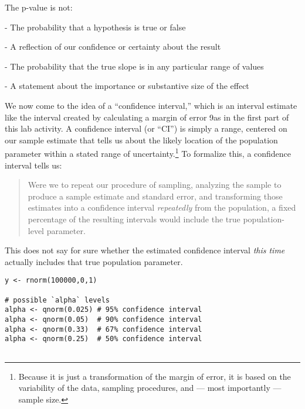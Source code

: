 \documentclass[a4paper,12pt]{article}
\begin{document}
\begin{enumerate*}


The p-value is not:

  - The probability that a hypothesis is true or false

  - A reflection of our confidence or certainty about the result

  - The probability that the true slope is in any particular range of values

  - A statement about the importance or substantive size of the effect
  
  




\item We now come to the idea of a ``confidence interval,'' which is an interval estimate like the interval created by calculating a margin of error 9as in the first part of this lab activity. A confidence interval (or ``CI'') is simply a range, centered on our sample estimate that tells us about the likely location of the population parameter within a stated range of uncertainty.\footnote{Because it is just a transformation of the margin of error, it is based on the variability of the data, sampling procedures, and --- most importantly --- sample size.} To formalize this, a confidence interval tells us:

\begin{quote}
Were we to repeat our procedure of sampling, analyzing the sample to produce a sample estimate and standard error, and transforming those estimates into a confidence interval \textit{repeatedly} from the population, a fixed percentage of the resulting intervals would include the true population-level parameter.
\end{quote}
        
\noindent This does not say for sure whether the estimated confidence interval \textit{this time} actually includes that true population parameter.
        



        

\begin{verbatim}
y <- rnorm(100000,0,1)

# possible `alpha` levels
alpha <- qnorm(0.025) # 95% confidence interval
alpha <- qnorm(0.05)  # 90% confidence interval
alpha <- qnorm(0.33)  # 67% confidence interval
alpha <- qnorm(0.25)  # 50% confidence interval


\end{verbatim}
\end{enumerate*}
\end{document}
